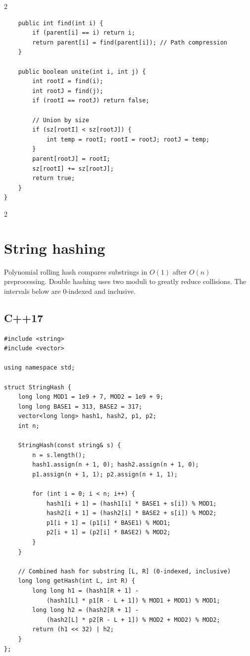 \documentclass[10pt]{article}
\begin{document}
\begin{multicols}{2}
\begin{framed}
\begin{verbatim}
    public int find(int i) {
        if (parent[i] == i) return i;
        return parent[i] = find(parent[i]); // Path compression
    }

    public boolean unite(int i, int j) {
        int rootI = find(i);
        int rootJ = find(j);
        if (rootI == rootJ) return false;

        // Union by size
        if (sz[rootI] < sz[rootJ]) {
            int temp = rootI; rootI = rootJ; rootJ = temp;
        }
        parent[rootJ] = rootI;
        sz[rootI] += sz[rootJ];
        return true;
    }
}
\end{verbatim}
\end{framed}

\end{multicols}
\newpage
\begin{multicols}{2}

\section{String hashing}
Polynomial rolling hash compares substrings in $O(1)$ after $O(n)$
preprocessing. Double hashing uses two moduli to greatly reduce collisions.
The intervals below are 0-indexed and inclusive.

\subsection{C++17}
\begin{framed}
\scriptsize
\begin{verbatim}
#include <string>
#include <vector>

using namespace std;

struct StringHash {
    long long MOD1 = 1e9 + 7, MOD2 = 1e9 + 9;
    long long BASE1 = 313, BASE2 = 317;
    vector<long long> hash1, hash2, p1, p2;
    int n;

    StringHash(const string& s) {
        n = s.length();
        hash1.assign(n + 1, 0); hash2.assign(n + 1, 0);
        p1.assign(n + 1, 1); p2.assign(n + 1, 1);

        for (int i = 0; i < n; i++) {
            hash1[i + 1] = (hash1[i] * BASE1 + s[i]) % MOD1;
            hash2[i + 1] = (hash2[i] * BASE2 + s[i]) % MOD2;
            p1[i + 1] = (p1[i] * BASE1) % MOD1;
            p2[i + 1] = (p2[i] * BASE2) % MOD2;
        }
    }

    // Combined hash for substring [L, R] (0-indexed, inclusive)
    long long getHash(int L, int R) {
        long long h1 = (hash1[R + 1] -
            (hash1[L] * p1[R - L + 1]) % MOD1 + MOD1) % MOD1;
        long long h2 = (hash2[R + 1] -
            (hash2[L] * p2[R - L + 1]) % MOD2 + MOD2) % MOD2;
        return (h1 << 32) | h2;
    }
};


\end{verbatim}
\end{framed}
\end{multicols}
\end{document}
